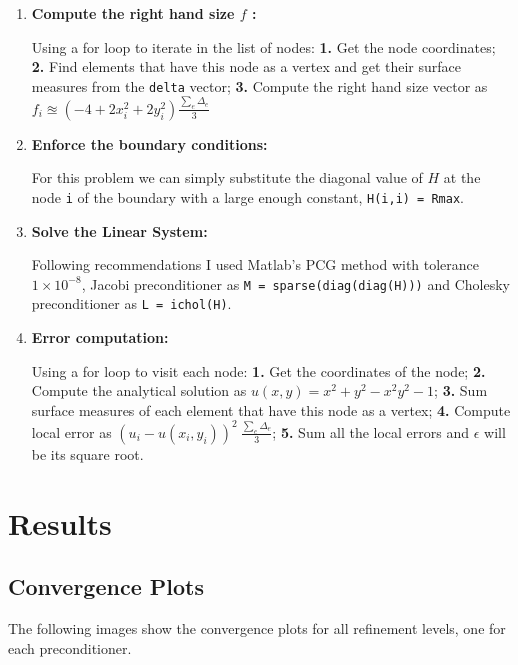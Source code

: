 \documentclass[a4paper, 11pt]{article}
\begin{document}
\begin{enumerate}
				\item  \textbf{Compute the right hand size $f$ :}
				
					Using a for loop to iterate in the list of nodes:
					\subitem \textbf{1.} Get the node coordinates;
					\subitem \textbf{2.} Find elements that have this node as a vertex and get their surface measures from the \texttt{delta} vector;
					\subitem \textbf{3.} Compute the right hand size vector as $f_i \approxeq (-4 +2x_i^2 + 2y_i^2)  \frac{\sum_e \Delta_e}{3} $
				
				\item \textbf{Enforce the boundary conditions:}
				
					For this problem we can simply substitute the diagonal value of $ H $ at the node \texttt{i} of the boundary with a large enough constant, \texttt{H(i,i) = Rmax}.
					
				
				\item \textbf{Solve the Linear System:}
				
					Following recommendations I used Matlab's PCG method with tolerance $ 1 \times 10^{-8} $, Jacobi preconditioner as \texttt{M = sparse(diag(diag(H)))} and Cholesky preconditioner as \texttt{L = ichol(H)}.
				
				\item \textbf{Error computation:}
				
					 Using a for loop to visit each node:
					\subitem \textbf{1.} Get the coordinates of the node;
					\subitem \textbf{2.} Compute the analytical solution as $u(x,y) = x^2 + y^2 - x^2y^2 - 1$;
					\subitem \textbf{3.} Sum surface measures of each element that have this node as a vertex;
					\subitem \textbf{4.} Compute local error as $ (u_i - u(x_i,y_i))^ 2 \ \frac{\sum_e \Delta_e}{3} $;
					\subitem \textbf{5.} Sum all the local errors and $ \epsilon $ will be its square root.	
			\end{enumerate}
			
					
		\section{Results}
		
			\subsection{Convergence Plots}
			
				The following images show the convergence plots for all refinement levels, one for each preconditioner.
				
\end{document}
